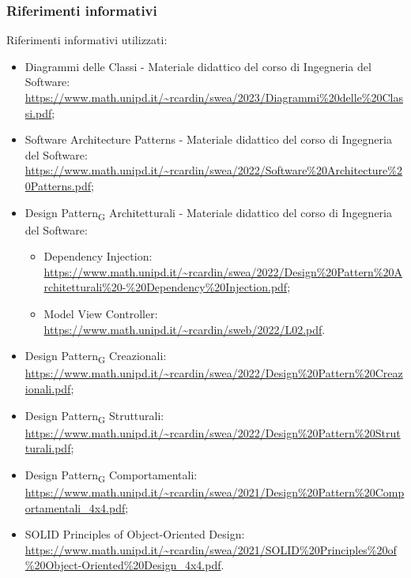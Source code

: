 \subsubsection{Riferimenti informativi}
Riferimenti informativi utilizzati:
\begin{itemize}
	\item Diagrammi delle Classi - Materiale didattico del corso di Ingegneria del Software: \\
		\url{https://www.math.unipd.it/~rcardin/swea/2023/Diagrammi\%20delle\%20Classi.pdf};
	\item Software Architecture Patterns - Materiale didattico del corso di Ingegneria del Software: \\
		\url{https://www.math.unipd.it/~rcardin/swea/2022/Software\%20Architecture\%20Patterns.pdf};
	\item Design Pattern\textsubscript{G} Architetturali - Materiale didattico del corso di Ingegneria del Software:
	\begin{itemize}
		\item Dependency Injection: 
		\url{https://www.math.unipd.it/~rcardin/swea/2022/Design\%20Pattern\%20Architetturali\%20-\%20Dependency\%20Injection.pdf};
		\item Model View Controller:
		\url{https://www.math.unipd.it/~rcardin/sweb/2022/L02.pdf}.
	\end{itemize}
	\item Design Pattern\textsubscript{G} Creazionali:\\
		\url{https://www.math.unipd.it/~rcardin/swea/2022/Design\%20Pattern\%20Creazionali.pdf};
	\item Design Pattern\textsubscript{G} Strutturali:\\
		\url{https://www.math.unipd.it/~rcardin/swea/2022/Design\%20Pattern\%20Strutturali.pdf};
	\item Design Pattern\textsubscript{G} Comportamentali:\\
		\url{https://www.math.unipd.it/~rcardin/swea/2021/Design\%20Pattern\%20Comportamentali_4x4.pdf};
	\item SOLID Principles of Object-Oriented Design:\\
		\url{https://www.math.unipd.it/~rcardin/swea/2021/SOLID\%20Principles\%20of\%20Object-Oriented\%20Design_4x4.pdf}.
\end{itemize}

